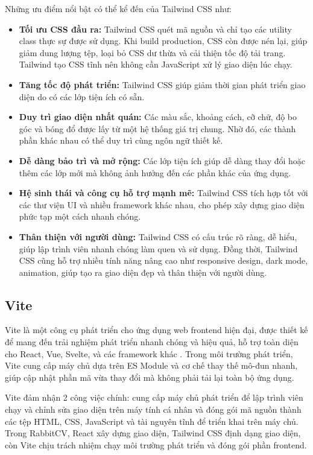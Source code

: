 Những ưu điểm nổi bật có thể kể đến của Tailwind CSS như:

\begin{itemize}
    \item \textbf{Tối ưu CSS đầu ra:} Tailwind CSS quét mã nguồn và chỉ tạo các utility class thực sự được sử dụng. Khi build production, CSS còn được nén lại, giúp giảm dung lượng tệp, loại bỏ CSS dư thừa và cải thiện tốc độ tải trang. Tailwind tạo CSS tĩnh nên không cần JavaScript xử lý giao diện lúc chạy.
    \item \textbf{Tăng tốc độ phát triển:} Tailwind CSS giúp giảm thời gian phát triển giao diện do có các lớp tiện ích có sẵn.
    \item \textbf{Duy trì giao diện nhất quán:} Các màu sắc, khoảng cách, cỡ chữ, độ bo góc và bóng đổ được lấy từ một hệ thống giá trị chung. Nhờ đó, các thành phần khác nhau có thể duy trì cùng ngôn ngữ thiết kế.
    \item \textbf{Dễ dàng bảo trì và mở rộng:} Các lớp tiện ích giúp dễ dàng thay đổi hoặc thêm các lớp mới mà không ảnh hưởng đến các phần khác của ứng dụng.
    \item \textbf{Hệ sinh thái và công cụ hỗ trợ mạnh mẽ:} Tailwind CSS tích hợp tốt với các thư viện UI và nhiều framework khác nhau, cho phép xây dựng giao diện phức tạp một cách nhanh chóng.
    \item \textbf{Thân thiện với người dùng:} Tailwind CSS có cấu trúc rõ ràng, dễ hiểu, giúp lập trình viên nhanh chóng làm quen và sử dụng. Đồng thời, Tailwind CSS cũng hỗ trợ nhiều tính năng nâng cao như responsive design, dark mode, animation, giúp tạo ra giao diện đẹp và thân thiện với người dùng.
\end{itemize}

\subsection{Vite}

Vite là một công cụ phát triển cho ứng dụng web frontend hiện đại, được thiết kế để mang đến trải nghiệm phát triển nhanh chóng và hiệu quả, hỗ trợ toàn diện cho React, Vue, Svelte, và các framework khác \cite{vitedocs}. Trong môi trường phát triển, Vite cung cấp máy chủ dựa trên ES Module và cơ chế thay thế mô-đun nhanh, giúp cập nhật phần mã vừa thay đổi mà không phải tải lại toàn bộ ứng dụng.

Vite đảm nhận 2 công việc chính: cung cấp máy chủ phát triển để lập trình viên chạy và chỉnh sửa giao diện trên máy tính cá nhân và đóng gói mã nguồn thành các tệp HTML, CSS, JavaScript và tài nguyên tĩnh để triển khai trên máy chủ. Trong RabbitCV, React xây dựng giao diện, Tailwind CSS định dạng giao diện, còn Vite chịu trách nhiệm chạy môi trường phát triển và đóng gói phần frontend.

